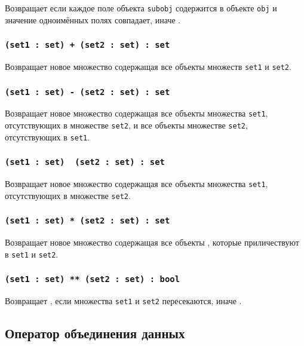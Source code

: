 Возвращает \false{} если каждое поле объекта \texttt{subobj} содержится в объекте \texttt{obj} и значение одноимённых полях совпадает, иначе \true{}.

\subsubsection{\texttt{(set1 : set) + (set2 : set) : set}}

Возвращает новое множество содержащая все объекты множеств \texttt{set1} и \texttt{set2}.

\subsubsection{\texttt{(set1 : set) - (set2 : set) : set}}

Возвращает новое множество содержащая все объекты множества \texttt{set1}, отсутствующих в множестве \texttt{set2}, и все объекты множестве \texttt{set2}, отсутствующих в \texttt{set1}.

\subsubsection{\texttt{(set1 : set) \ (set2 : set) : set}}

Возвращает новое множество содержащая все объекты множества \texttt{set1}, отсутствующих в множестве \texttt{set2}.

\subsubsection{\texttt{(set1 : set) * (set2 : set) : set}}

Возвращает новое множество содержащая все объекты , которые приличествуют в \texttt{set1} и \texttt{set2}.

\subsubsection{\texttt{(set1 : set) ** (set2 : set) : bool}}

Возвращает \true, если множества \texttt{set1} и \texttt{set2} пересекаются, иначе \false.

\subsection{Оператор объединения данных}

